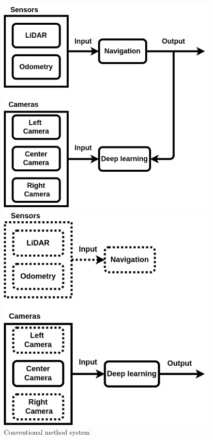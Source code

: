 \newpage
\begin{figure}[h]
  \begin{minipage}[b]{0.5\linewidth}
    \centering
    \includegraphics[scale=0.3]{images/old-method1.png}
  \end{minipage}
  \begin{minipage}[b]{0.45\linewidth}
    \centering
    \includegraphics[scale=0.3]{images/old-method2.png}
  \end{minipage}
  \caption{Conventional method system}
  \label{Fig:conv-method}%
\end{figure}

